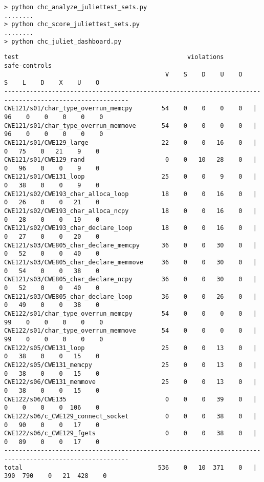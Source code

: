 \documentclass[11pt]{article}
\begin{document}
\begin{verbatim}
> python chc_analyze_juliettest_sets.py
........
> python chc_score_juliettest_sets.py
........
> python chc_juliet_dashboard.py
\end{verbatim}
\begin{scriptsize}
\begin{verbatim}
test                                              violations                       safe-controls
                                            V    S    D    U    O          S    L    D    X    U    O
--------------------------------------------------------------------------------------------------------
CWE121/s01/char_type_overrun_memcpy        54    0    0    0    0   |     96    0    0    0    0    0
CWE121/s01/char_type_overrun_memmove       54    0    0    0    0   |     96    0    0    0    0    0
CWE121/s01/CWE129_large                    22    0    0   16    0   |      0   75    0   21    9    0
CWE121/s01/CWE129_rand                      0    0   10   28    0   |      0   96    0    0    9    0
CWE121/s01/CWE131_loop                     25    0    0    9    0   |      0   38    0    0    9    0
CWE121/s02/CWE193_char_alloca_loop         18    0    0   16    0   |      0   26    0    0   21    0
CWE121/s02/CWE193_char_alloca_ncpy         18    0    0   16    0   |      0   28    0    0   19    0
CWE121/s02/CWE193_char_declare_loop        18    0    0   16    0   |      0   27    0    0   20    0
CWE121/s03/CWE805_char_declare_memcpy      36    0    0   30    0   |      0   52    0    0   40    0
CWE121/s03/CWE805_char_declare_memmove     36    0    0   30    0   |      0   54    0    0   38    0
CWE121/s03/CWE805_char_declare_ncpy        36    0    0   30    0   |      0   52    0    0   40    0
CWE121/s03/CWE805_char_declare_loop        36    0    0   26    0   |      0   49    0    0   38    0
CWE122/s01/char_type_overrun_memcpy        54    0    0    0    0   |     99    0    0    0    0    0
CWE122/s01/char_type_overrun_memmove       54    0    0    0    0   |     99    0    0    0    0    0
CWE122/s05/CWE131_loop                     25    0    0   13    0   |      0   38    0    0   15    0
CWE122/s05/CWE131_memcpy                   25    0    0   13    0   |      0   38    0    0   15    0
CWE122/s06/CWE131_memmove                  25    0    0   13    0   |      0   38    0    0   15    0
CWE122/s06/CWE135                           0    0    0   39    0   |      0    0    0    0  106    0
CWE122/s06/c_CWE129_connect_socket          0    0    0   38    0   |      0   90    0    0   17    0
CWE122/s06/c_CWE129_fgets                   0    0    0   38    0   |      0   89    0    0   17    0
--------------------------------------------------------------------------------------------------------
total                                     536    0   10  371    0   |    390  790    0   21  428    0



\end{verbatim}
\end{scriptsize}
\end{document}
